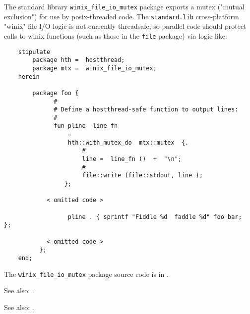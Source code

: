 
The standard library {\tt winix\_file\_io\_mutex} package exports a mutex ("mutual exclusion") 
for use by posix-threaded code.  The {\tt standard.lib} cross-platform "winix" file I/O logic 
is not currently threadsafe, so parallel code should protect calls to winix functions (such 
as those in the {\tt file} package) via logic like:

\begin{verbatim}
    stipulate
        package hth =  hostthread;
        package mtx =  winix_file_io_mutex;
    herein
    
        package foo {
              #
              # Define a hostthread-safe function to output lines:
              #
              fun pline  line_fn
                  =
                  hth::with_mutex_do  mtx::mutex  {.
                      #
                      line =  line_fn ()  +  "\n";
                      #
                      file::write (file::stdout, line );
                 };
    
            < omitted code >

                  pline . { sprintf "Fiddle %d  faddle %d" foo bar;  };
                
            < omitted code >
          };
    end;
\end{verbatim}

The {\tt winix\_file\_io\_mutex} package source code is in .

See also:    .

See also:    .

